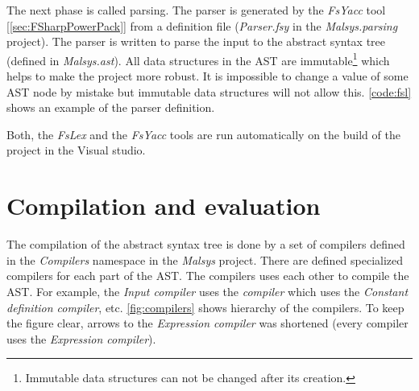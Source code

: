 The next phase is called parsing.
The parser is generated by the \emph{FsYacc} tool [\ref{sec:FSharpPowerPack}] from a definition file (\emph{Parser.fsy} in the \emph{Malsys.parsing} project).
The parser is written to parse the input to the abstract syntax tree (defined in \emph{Malsys.ast}).
All data structures in the AST are immutable\footnote{Immutable data structures can not be changed after its creation.} which helps to make the project more robust.
It is impossible to change a value of some AST node by mistake but immutable data structures will not allow this.
\autoref{code:fsl} shows an example of the parser definition.

Both, the \emph{FsLex} and the \emph{FsYacc} tools are run automatically on the build of the project in the Visual studio.



\section{Compilation and evaluation}

The compilation of the abstract syntax tree is done by a set of compilers defined in the \emph{Compilers} namespace in the \emph{Malsys} project.
There are defined specialized compilers for each part of the AST.
The compilers uses each other to compile the AST.
For example, the \emph{Input compiler} uses the \emph{\lsystem compiler} which uses the \emph{Constant definition compiler}, etc.
\autoref{fig:compilers} shows hierarchy of the compilers.
To keep the figure clear, arrows to the \emph{Expression compiler} was shortened (every compiler uses the \emph{Expression compiler}).


